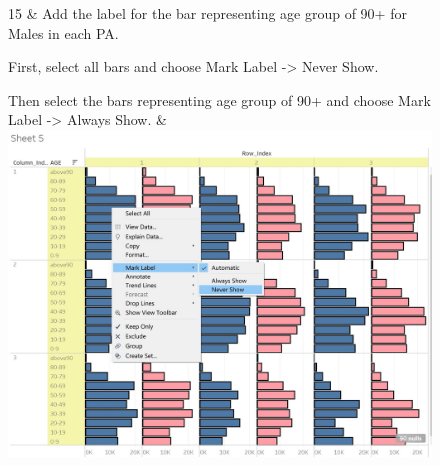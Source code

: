 \documentclass[
  letterpaper,
  DIV=11,
  numbers=noendperiod,
  oneside]{scrartcl}
\begin{document}
\begin{figure}
\begin{longtable}[]
15 & Add the label for the bar representing age group of 90+ for Males
in each PA.

First, select all bars and choose Mark Label -\textgreater{} Never Show.

Then select the bars representing age group of 90+ and choose Mark Label
-\textgreater{} Always Show. & \includegraphics{images/add label 0.jpg}


\end{longtable}
\end{figure}
\end{document}
